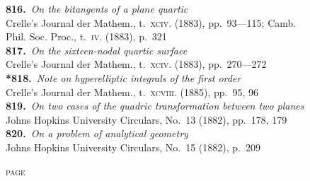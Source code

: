\documentclass[11pt,a4paper]{article}
\providecommand{\textsc}[1]{{\scshape #1}}
\begin{document}
\textbf{816.}~\textit{On the bitangents of a plane quartic}~\\
\hspace*{2em}Crelle's Journal der Mathem., t.~\textsc{xciv}. (1883), pp.~93---115; Camb.\\
\hspace*{2em}Phil. Soc. Proc., t.~\textsc{iv}. (1883), p.~321\\[0.3em]
\textbf{817.}~\textit{On the sixteen-nodal quartic surface}~\\
\hspace*{2em}Crelle's Journal der Mathem., t.~\textsc{xciv}. (1883), pp.~270---272\\[0.3em]
\textbf{*818.}~\textit{Note on hyperelliptic integrals of the first order}~\\
\hspace*{2em}Crelle's Journal der Mathem., t.~\textsc{xcviii}. (1885), pp.~95, 96\\[0.3em]
\textbf{819.}~\textit{On two cases of the quadric transformation between two planes}~\\
\hspace*{2em}Johns Hopkins University Circulars, No.~13 (1882), pp.~178, 179\\[0.3em]
\textbf{820.}~\textit{On a problem of analytical geometry}~\\
\hspace*{2em}Johns Hopkins University Circulars, No.~15 (1882), p.~209

\clearpage

\thispagestyle{plain}
\vspace*{1em}
\hfill\textsc{page}
\end{document}
